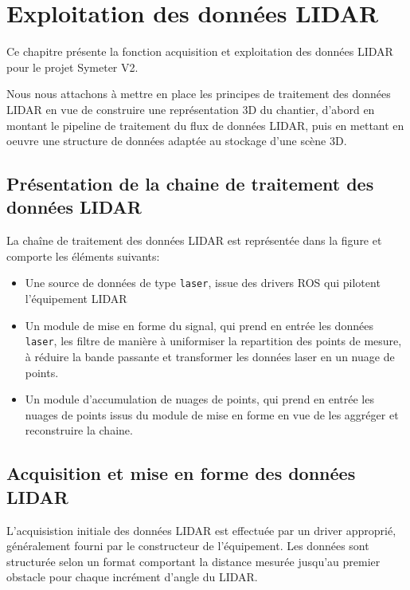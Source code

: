 \documentclass[12pt,a4paper]{report}
\begin{document}
	
\chapter{Exploitation des données LIDAR}

Ce chapitre présente la fonction acquisition et exploitation des données LIDAR pour le projet Symeter V2. 

\para Nous nous attachons à mettre en place les principes de traitement des données LIDAR en vue de construire une représentation 3D du chantier, d'abord en montant le pipeline de traitement du flux de données LIDAR, puis en mettant en oeuvre une structure de données adaptée au stockage d'une scène 3D.

	\section{Présentation de la chaine de traitement des données LIDAR}
	
	La chaîne de traitement des données LIDAR est représentée dans la figure  et comporte les éléments suivants:
	\begin{itemize}
		\item Une source de données de type \verb|laser|, issue des drivers ROS qui pilotent l'équipement LIDAR
		
		\item Un module de mise en forme du signal, qui prend en entrée les données \verb|laser|, les filtre de manière à uniformiser la repartition des points de mesure, à réduire la bande passante et transformer les données laser en un nuage de points.
		
		\item Un module d'accumulation de nuages de points, qui prend en entrée les nuages de points issus du module de mise en forme en vue de les aggréger et reconstruire la chaine.
	\end{itemize}
	
	
	\section{Acquisition et mise en forme des données LIDAR}
	L'acquisistion initiale des données LIDAR est effectuée par un driver approprié, généralement fourni par le constructeur de l'équipement. Les données sont structurée selon un format comportant la distance mesurée jusqu'au premier obstacle pour chaque incrément d'angle du LIDAR.
\end{document}
